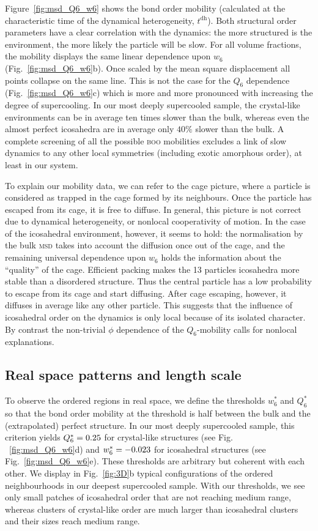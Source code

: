 Figure~\ref{fig:msd_Q6_w6} shows the bond order mobility (calculated at the characteristic time of the dynamical heterogeneity, $t^\text{dh}$). Both structural order parameters have a clear correlation with the dynamics: the more structured is the environment, the more likely the particle will be slow. For all volume fractions, the mobility displays the same linear dependence upon $w_6$ (Fig.~\ref{fig:msd_Q6_w6}b). Once scaled by the mean square displacement all points collapse on the same line. This is not the case for the $Q_6$ dependence (Fig.~\ref{fig:msd_Q6_w6}c) which is more and more pronounced with increasing the degree of supercooling. In our most deeply supercooled sample, the crystal-like environments can be in average ten times slower than the bulk, whereas even the almost perfect icosahedra are in average only $40\%$ slower than the bulk. A complete screening of all the possible \textsc{boo} mobilities excludes a link of slow dynamics to any other local symmetries (including exotic amorphous order), at least in our system.

To explain our mobility data, we can refer to the cage picture, where a particle is considered as trapped in the cage formed by its neighbours. Once the particle has escaped from its cage, it is free to diffuse. In general, this picture is not correct due to dynamical heterogeneity, or nonlocal cooperativity of motion. In the case of the icosahedral environment, however, it seems to hold: the normalisation by the bulk \textsc{msd} takes into account the diffusion once out of the cage, and the remaining universal dependence upon $w_6$ holds the information about the ``quality'' of the cage. Efficient packing makes the 13 particles icosahedra more stable than a disordered structure. Thus the central particle has a low probability to escape from its cage and start diffusing. After cage escaping, however, it diffuses in average like any other particle. This suggests that the influence of icosahedral order on the dynamics is only local because of its isolated character. By contrast the non-trivial $\phi$ dependence of the $Q_6$-mobility calls for nonlocal explanations.

\subsection*{Real space patterns and length scale}
To observe the ordered regions in real space, we define the thresholds $w_6^*$ and $Q_6^*$ so that the bond order mobility at the threshold is half between the bulk and the (extrapolated) perfect structure. In our most deeply supercooled sample, this criterion yields $Q_6^* = 0.25$ for crystal-like structures (see Fig. ~\ref{fig:msd_Q6_w6}d) and $w_6^* = -0.023$ for icosahedral structures (see Fig.~\ref{fig:msd_Q6_w6}e). These thresholds are arbitrary but coherent with each other. We display in Fig.~\ref{fig:3D}b typical configurations of the ordered neighbourhoods in our deepest supercooled sample. With our thresholds, we see only small patches of icosahedral order that are not reaching medium range, whereas clusters of crystal-like order are much larger than icosahedral clusters and their sizes reach medium range. 


